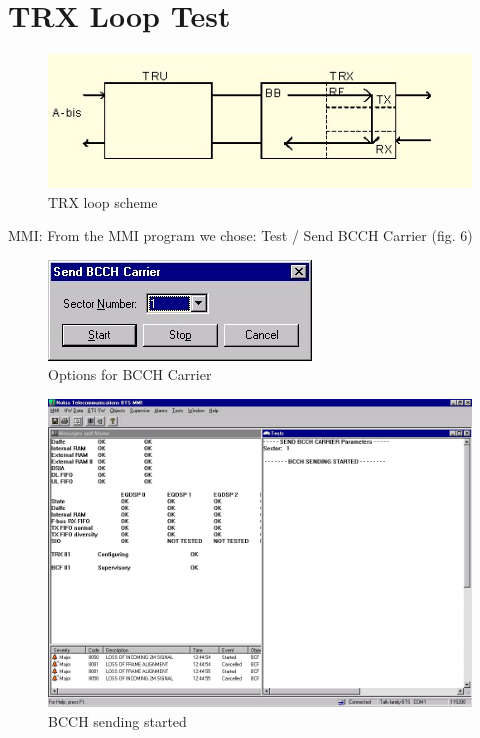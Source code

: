 \documentclass[english]{article}
\begin{document}
\section{TRX Loop Test}
\begin{figure}
\centerline{\includegraphics[scale=1]{GSM/Pic5}}
\caption{TRX loop scheme}
\end{figure}
MMI: From the MMI program we chose: Test / Send BCCH Carrier (fig. 6)
\begin{figure}
\centerline{\includegraphics[scale=1]{GSM/Pic6}}
\caption{Options for BCCH Carrier}
\end{figure}
\begin{figure}
\centerline{\includegraphics[scale=0.5]{GSM/Pic7}}
\caption{BCCH sending started}
\end{figure}
\end{document}
